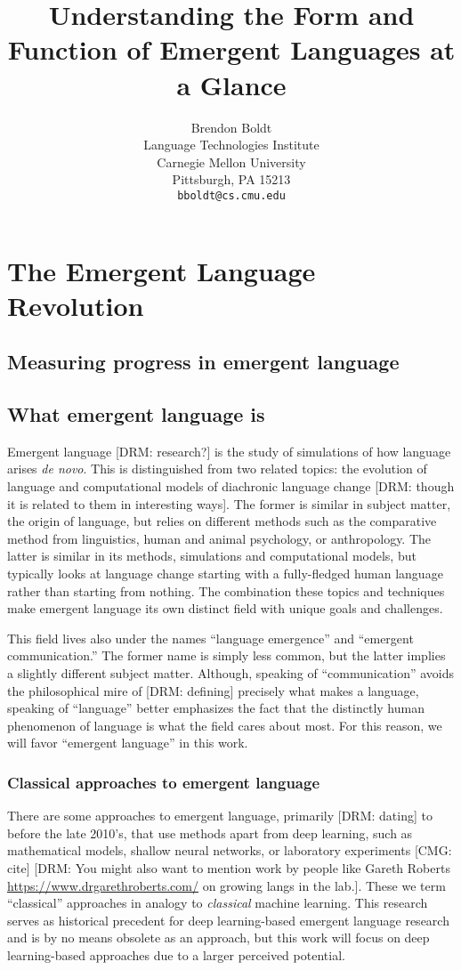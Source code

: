 \documentclass[letterpaper]{report}
\title{Understanding the Form and Function of Emergent Languages at a Glance}
\author{%
  Brendon Boldt\\
  Language Technologies Institute\\
  Carnegie Mellon University\\
  Pittsburgh, PA 15213 \\
  \texttt{bboldt@cs.cmu.edu} \\
}
\newcommand\cmg[1]{{\color{gray}[CMG: #1]}}
\newcommand\drm[1]{{\color{red}[DRM: #1]}}
\begin{document}
\maketitle

\setcounter{tocdepth}{1}
\tableofcontents



\chapter{The Emergent Language Revolution}
\section{Measuring progress in emergent language}
\section{What emergent language is}
Emergent language \drm{research?} is the study of simulations of how language arises \emph{de novo}.
This is distinguished from two related topics: the evolution of language and computational models of diachronic language change \drm{though it is related to them in interesting ways}.
The former is similar in subject matter, the origin of language, but relies on different methods such as the comparative method from linguistics, human and animal psychology, or anthropology.
The latter is similar in its methods, simulations and computational models, but typically looks at language change starting with a fully-fledged human language rather than starting from nothing.
The combination these topics and techniques make emergent language its own distinct field with unique goals and challenges.

This field lives also under the names ``language emergence'' and ``emergent communication.''
The former name is simply less common, but the latter implies a slightly different subject matter.
Although, speaking of ``communication'' avoids the philosophical mire of \drm{defining} precisely what makes a language, speaking of ``language'' better emphasizes the fact that the distinctly human phenomenon of language is what the field cares about most.
For this reason, we will favor ``emergent language'' in this work.

\subsection{Classical approaches to emergent language}
There are some approaches to emergent language, primarily \drm{dating} to before the late 2010's, that use methods apart from deep learning, such as mathematical models, shallow neural networks, or laboratory experiments \cmg{cite} \drm{You might also want to mention work by people like Gareth Roberts \url{https://www.drgarethroberts.com/} on growing langs in the lab.}.
These we term ``classical'' approaches in analogy to \emph{classical} machine learning.
This research serves as historical precedent for deep learning-based emergent language research and is by no means obsolete as an approach, but this work will focus on deep learning-based approaches due to a larger perceived potential.
\end{document}
